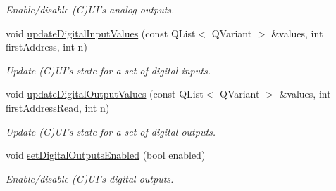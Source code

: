 \begin{DoxyCompactItemize}
\begin{DoxyCompactList}\small\item\em Enable/disable (G)UI's analog outputs. \end{DoxyCompactList}\item 
void \hyperlink{classmdt_device_ios_a349253f24f42bdbc012812120405ae06}{updateDigitalInputValues} (const QList$<$ QVariant $>$ \&values, int firstAddress, int n)
\begin{DoxyCompactList}\small\item\em Update (G)UI's state for a set of digital inputs. \end{DoxyCompactList}\item 
void \hyperlink{classmdt_device_ios_a130769d03889ccdb7649dfcc605730b9}{updateDigitalOutputValues} (const QList$<$ QVariant $>$ \&values, int firstAddressRead, int n)
\begin{DoxyCompactList}\small\item\em Update (G)UI's state for a set of digital outputs. \end{DoxyCompactList}\item 
\hypertarget{classmdt_device_ios_ab1d98b31f7845c0015ac16728038d2db}{
void \hyperlink{classmdt_device_ios_ab1d98b31f7845c0015ac16728038d2db}{setDigitalOutputsEnabled} (bool enabled)}
\label{classmdt_device_ios_ab1d98b31f7845c0015ac16728038d2db}

\begin{DoxyCompactList}\small\item\em Enable/disable (G)UI's digital outputs. \end{DoxyCompactList}\end{DoxyCompactItemize}
